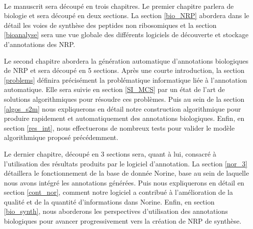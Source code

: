 ~~

Le manuscrit sera découpé en trois chapitres.
Le premier chapitre parlera de biologie et sera découpé en deux sections.
La section \ref{bio_NRP} abordera dans le détail les voies de synthèse des peptides non ribosomiques et la section \ref{bioanalyse} sera une vue globale des différents logiciels de découverte et stockage d'annotations des NRP.

Le second chapitre abordera la génération automatique d'annotations biologiques de NRP et sera découpé en 5 sections.
Après une courte introduction, la section \ref{problems} définira précisément la problématique informatique liée à l'annotation automatique.
Elle sera suivie en section \ref{SI_MCS} par un état de l'art de solutions algorithmiques pour résoudre ces problèmes.
Puis au sein de la section \ref{algos_s2m} nous expliquerons en détail notre construction algorithmique pour produire rapidement et automatiquement des annotations biologiques.
Enfin, en section \ref{res_int}, nous effectuerons de nombreux tests pour valider le modèle algorithmique proposé précédemment.

Le dernier chapitre, découpé en 3 sections sera, quant à lui, consacré à l'utilisation des résultats produits par le logiciel d'annotation.
La section \ref{nor_3} détaillera le fonctionnement de la base de donnée Norine, base au sein de laquelle nous avons intégré les annotations générées.
Puis nous expliquerons en détail en section \ref{cont_nor}, comment notre logiciel a contribué à l'amélioration de la qualité et de la quantité d'informations dans Norine.
Enfin, en section \ref{bio_synth}, nous aborderons les perspectives d'utilisation des annotations biologiques pour avancer progressivement vers la création de NRP de synthèse.
